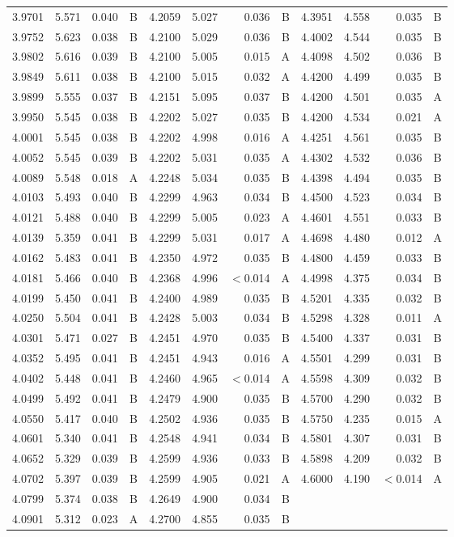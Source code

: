 \begin{tabular}{rrrc|rrrc|rrrc}
3.9701 & 5.571 & 0.040 & B & 4.2059 & 5.027 & 0.036 & B & 4.3951 & 4.558 & 0.035 & B \\
3.9752 & 5.623 & 0.038 & B & 4.2100 & 5.029 & 0.036 & B & 4.4002 & 4.544 & 0.035 & B \\
3.9802 & 5.616 & 0.039 & B & 4.2100 & 5.005 & 0.015 & A & 4.4098 & 4.502 & 0.036 & B \\
3.9849 & 5.611 & 0.038 & B & 4.2100 & 5.015 & 0.032 & A & 4.4200 & 4.499 & 0.035 & B \\
3.9899 & 5.555 & 0.037 & B & 4.2151 & 5.095 & 0.037 & B & 4.4200 & 4.501 & 0.035 & A \\
3.9950 & 5.545 & 0.038 & B & 4.2202 & 5.027 & 0.035 & B & 4.4200 & 4.534 & 0.021 & A \\
4.0001 & 5.545 & 0.038 & B & 4.2202 & 4.998 & 0.016 & A & 4.4251 & 4.561 & 0.035 & B \\
4.0052 & 5.545 & 0.039 & B & 4.2202 & 5.031 & 0.035 & A & 4.4302 & 4.532 & 0.036 & B \\
4.0089 & 5.548 & 0.018 & A & 4.2248 & 5.034 & 0.035 & B & 4.4398 & 4.494 & 0.035 & B \\
4.0103 & 5.493 & 0.040 & B & 4.2299 & 4.963 & 0.034 & B & 4.4500 & 4.523 & 0.034 & B \\
4.0121 & 5.488 & 0.040 & B & 4.2299 & 5.005 & 0.023 & A & 4.4601 & 4.551 & 0.033 & B \\
4.0139 & 5.359 & 0.041 & B & 4.2299 & 5.031 & 0.017 & A & 4.4698 & 4.480 & 0.012 & A \\
4.0162 & 5.483 & 0.041 & B & 4.2350 & 4.972 & 0.035 & B & 4.4800 & 4.459 & 0.033 & B \\
4.0181 & 5.466 & 0.040 & B & 4.2368 & 4.996 & $<$0.014 & A & 4.4998 & 4.375 & 0.034 & B \\
4.0199 & 5.450 & 0.041 & B & 4.2400 & 4.989 & 0.035 & B & 4.5201 & 4.335 & 0.032 & B \\
4.0250 & 5.504 & 0.041 & B & 4.2428 & 5.003 & 0.034 & B & 4.5298 & 4.328 & 0.011 & A \\
4.0301 & 5.471 & 0.027 & B & 4.2451 & 4.970 & 0.035 & B & 4.5400 & 4.337 & 0.031 & B \\
4.0352 & 5.495 & 0.041 & B & 4.2451 & 4.943 & 0.016 & A & 4.5501 & 4.299 & 0.031 & B \\
4.0402 & 5.448 & 0.041 & B & 4.2460 & 4.965 & $<$0.014 & A & 4.5598 & 4.309 & 0.032 & B \\
4.0499 & 5.492 & 0.041 & B & 4.2479 & 4.900 & 0.035 & B & 4.5700 & 4.290 & 0.032 & B \\
4.0550 & 5.417 & 0.040 & B & 4.2502 & 4.936 & 0.035 & B & 4.5750 & 4.235 & 0.015 & A \\
4.0601 & 5.340 & 0.041 & B & 4.2548 & 4.941 & 0.034 & B & 4.5801 & 4.307 & 0.031 & B \\
4.0652 & 5.329 & 0.039 & B & 4.2599 & 4.936 & 0.033 & B & 4.5898 & 4.209 & 0.032 & B \\
4.0702 & 5.397 & 0.039 & B & 4.2599 & 4.905 & 0.021 & A & 4.6000 & 4.190 & $<$0.014 & A \\
4.0799 & 5.374 & 0.038 & B & 4.2649 & 4.900 & 0.034 & B &  & & &  \\
4.0901 & 5.312 & 0.023 & A & 4.2700 & 4.855 & 0.035 & B &  & & &  \\
\bottomrule
\end{tabular}
